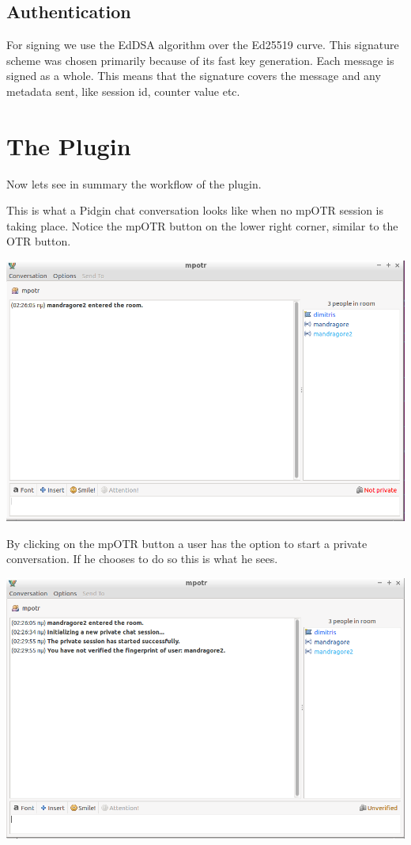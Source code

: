 \documentclass[]{article}
\begin{document}
\subsection{Authentication}
For signing we use the EdDSA algorithm over the Ed25519 curve.
This signature scheme was chosen primarily because of its fast key generation.
Each message is signed as a whole.
This means that the signature covers the message and any metadata sent, like session id, counter value etc.

\section{The Plugin}
Now lets see in summary the workflow of the plugin.

This is what a Pidgin chat conversation looks like when no mpOTR session is taking place.
Notice the mpOTR button on the lower right corner, similar to the OTR button.

\includegraphics[scale=0.4]{not_started_unverified.png}

By clicking on the mpOTR button a user has the option to start a private conversation.
If he chooses to do so this is what he sees.

\includegraphics[scale=0.4]{started_unverified.png}
\end{document}
